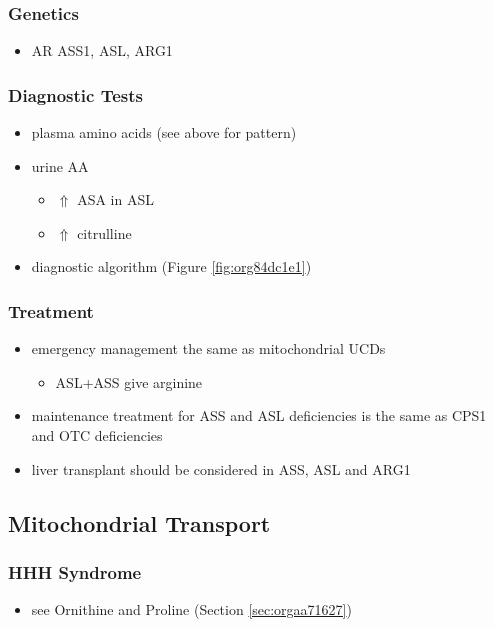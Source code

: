 \documentclass{scrartcl}
\begin{document}
\subsubsection{Genetics}
\label{sec:orgaec598f}
\begin{itemize}
\item AR ASS1, ASL, ARG1
\end{itemize}

\subsubsection{Diagnostic Tests}
\label{sec:orgf6c8593}
\begin{itemize}
\item plasma amino acids (see above for pattern)
\item urine AA
\begin{itemize}
\item \(\Uparrow\) ASA in ASL
\item \(\Uparrow\) citrulline
\end{itemize}
\item diagnostic algorithm (Figure \ref{fig:org84dc1e1})
\end{itemize}

\subsubsection{Treatment}
\label{sec:org53bb8d0}
\begin{itemize}
\item emergency management the same as mitochondrial UCDs
\begin{itemize}
\item ASL+ASS give arginine
\end{itemize}
\item maintenance treatment for ASS and ASL deficiencies is the same as
CPS1 and OTC deficiencies
\item liver transplant should be considered in ASS, ASL and ARG1
\end{itemize}

\subsection{Mitochondrial Transport}
\label{sec:org4f2844a}
\subsubsection{HHH Syndrome}
\label{sec:orge5048a0}
\begin{itemize}
\item see Ornithine and Proline (Section \ref{sec:orgaa71627})
\end{itemize}
\end{document}
